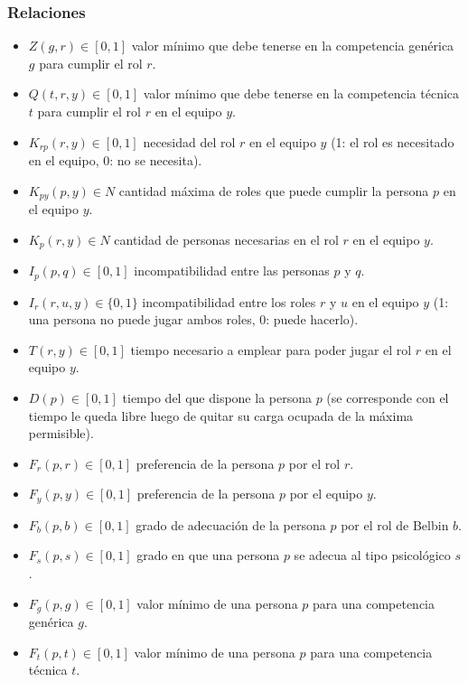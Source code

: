 \subsubsection{Relaciones} \label{relaciones}

\begin{itemize}
  \item $Z(g,r) \in [0,1]$ valor mínimo que debe tenerse en la competencia genérica $g$ para cumplir el rol $r$.
  
  \item $Q(t,r,y) \in [0,1]$ valor mínimo que debe tenerse en la competencia técnica $t$ para cumplir el rol $r$ en el equipo $y$.
  
  \item $K_{rp}(r, y) \in [0,1]$ necesidad del rol $r$ en el equipo $y$ (1: el rol es necesitado en el equipo, 0: no se necesita).
  
  \item $K_{py}(p,y) \in N$ cantidad máxima de roles que puede cumplir la persona $p$ en el equipo $y$.
  
  \item $K_{p}(r, y) \in N$ cantidad de personas necesarias en el rol $r$ en el equipo $y$.
  \item $I_p(p,q) \in [0,1]$ incompatibilidad entre las personas $p$ y $q$.
  
  \item $I_r(r,u,y) \in \{0,1\}$ incompatibilidad entre los roles $r$ y $u$ en el equipo $y$ (1: una persona no puede jugar ambos roles, 0: puede hacerlo).
  
  \item $T(r,y) \in [0,1]$ tiempo necesario a emplear para poder jugar el rol $r$ en el equipo $y$.
  
  \item $D(p) \in [0,1]$ tiempo del que dispone la persona $p$ (se corresponde con el tiempo le queda libre luego de quitar su carga ocupada de la máxima permisible).

  
  \item $F_r(p,r) \in [0,1]$ preferencia de la persona $p$ por el rol $r$.
  
  \item $F_y(p,y) \in [0,1]$ preferencia de la persona $p$ por el equipo $y$.
  
  \item $F_b(p,b) \in [0,1]$ grado de adecuación de la persona $p$ por el rol de Belbin $b$.
  
  \item $F_s(p,s) \in [0,1]$ grado en que una persona $p$ se adecua al tipo psicológico $s$.
  
  \item $F_g(p,g) \in [0,1]$ valor mínimo de una persona $p$ para una competencia genérica $g$.
  
  \item $F_t(p,t) \in [0,1]$ valor mínimo de una persona $p$ para una competencia técnica $t$.
\end{itemize}

